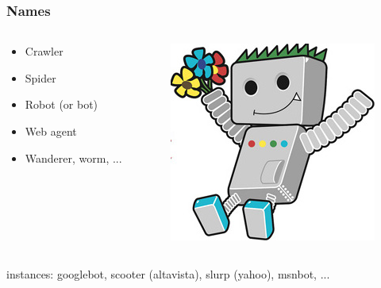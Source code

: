 \documentclass{beamer}
\begin{document}
\begin{frame} \frametitle{Names}

 \begin{columns}[T]
    \begin{column}{0.5\textwidth}

    \begin{itemize}
    \item Crawler
    \item Spider
    \item Robot (or bot)
    \item Web agent
    \item Wanderer, worm, ...
    \end{itemize}
\end{column}

\begin{column}{.5\textwidth}
 \includegraphics [width=.9\textwidth]{google-bot-logo-with-bot} 
\end{column}
\end{columns}

\begin{block}{instances:}
googlebot, scooter (altavista), slurp (yahoo), msnbot, ...
\end{block}

\end{frame}
\end{document}
